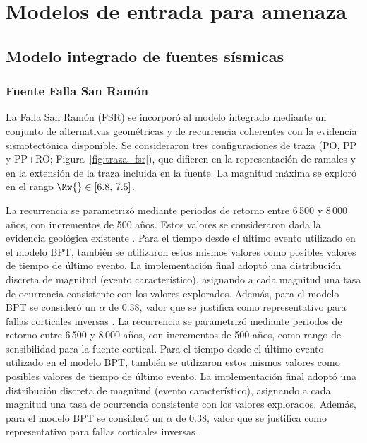 \section{Modelos de entrada para amenaza}
\label{sec:meto_entradas_amenaza}

\subsection{Modelo integrado de fuentes sísmicas}
\label{sec:meto_fuentes}

\subsubsection{Fuente Falla San Ramón}
\label{sec:meto_fsr}

La Falla San Ramón (FSR) se incorporó al modelo integrado mediante un conjunto de alternativas geométricas y de recurrencia coherentes con la evidencia sismotectónica disponible. Se consideraron tres configuraciones de traza (PO, PP y PP+RO; Figura~\ref{fig:traza_fsr}), que difieren en la representación de ramales y en la extensión de la traza incluida en la fuente. La magnitud máxima se exploró en el rango $\Mw{} \in [6.8,\,7.5]$.

\ifincludeprivatedata
La recurrencia se parametrizó mediante periodos de retorno entre 6\,500 y 8\,000 años, con incrementos de 500 años. Estos valores se consideraron dada la evidencia geológica existente \cite{campillay2025san}. Para el tiempo desde el último evento utilizado en el modelo BPT, también se utilizaron estos mismos valores como posibles valores de tiempo de último evento. La implementación final adoptó una distribución discreta de magnitud (evento característico), asignando a cada magnitud una tasa de ocurrencia consistente con los valores explorados. Además, para el modelo BPT se consideró un $\alpha$ de 0.38, valor que se justifica como representativo para fallas corticales inversas \cite{MatthewsEllsworthReasenberg2002}.
\else
La recurrencia se parametrizó mediante periodos de retorno entre 6\,500 y 8\,000 años, con incrementos de 500 años, como rango de sensibilidad para la fuente cortical. Para el tiempo desde el último evento utilizado en el modelo BPT, también se utilizaron estos mismos valores como posibles valores de tiempo de último evento. La implementación final adoptó una distribución discreta de magnitud (evento característico), asignando a cada magnitud una tasa de ocurrencia consistente con los valores explorados. Además, para el modelo BPT se consideró un $\alpha$ de 0.38, valor que se justifica como representativo para fallas corticales inversas \cite{MatthewsEllsworthReasenberg2002}.
\fi

